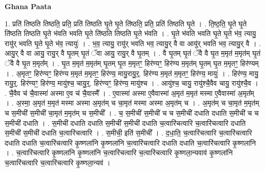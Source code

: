 \documentclass[17pt]{extarticle}
\begin{document}
\textbf{Ghana Paata } \newline

1. प्रति॑ तिष्ठति तिष्ठति॒ प्रति॒ प्रति॑ तिष्ठति घृ॒ते घृ॒ते ति॑ष्ठति॒ प्रति॒ प्रति॑ तिष्ठति घृ॒ते । . ति॒ष्ठ॒ति॒ घृ॒ते घृ॒ते ति॑ष्ठति तिष्ठति घृ॒ते भ॑वति भवति घृ॒ते ति॑ष्ठति तिष्ठति घृ॒ते भ॑वति । . घृ॒ते भ॑वति भवति घृ॒ते घृ॒ते भ॑व॒ त्यायु॒ रायु॑र् भवति घृ॒ते घृ॒ते भ॑व॒ त्यायुः॑ । . भ॒व॒ त्यायु॒ रायु॑र् भवति भव॒ त्यायु॒र् वै वा आयु॑र् भवति भव॒ त्यायु॒र् वै । . आयु॒र् वै वा आयु॒ रायु॒र् वै घृ॒तम् घृ॒तं ॅवा आयु॒ रायु॒र् वै घृ॒तम् । . वै घृ॒तम् घृ॒तं ॅवै वै घृ॒त म॒मृत॑ म॒मृत॑म् घृ॒तं ॅवै वै घृ॒त म॒मृत᳚म् । . घृ॒त म॒मृत॑ म॒मृत॑म् घृ॒तम् घृ॒त म॒मृतꣳ॒॒ हिर॑ण्यꣳ॒॒ हिर॑ण्य म॒मृत॑म् घृ॒तम् घृ॒त म॒मृतꣳ॒॒ हिर॑ण्यम् । . अ॒मृतꣳ॒॒ हिर॑ण्यꣳ॒॒ हिर॑ण्य म॒मृत॑ म॒मृतꣳ॒॒ हिर॑ण्य॒ मायु॒रायु॒र्॒. हिर॑ण्य म॒मृत॑ म॒मृतꣳ॒॒ हिर॑ण्य॒ मायुः॑ । . हिर॑ण्य॒ मायु॒ रायु॒र्॒. हिर॑ण्यꣳ॒॒ हिर॑ण्य॒ मायु॑श्च॒ चायु॒र्॒. हिर॑ण्यꣳ॒॒ हिर॑ण्य॒ मायु॑श्च । . आयु॑श्च॒ चायु॒ रायु॑श्चै॒वैव चायु॒ रायु॑श्चै॒व । . चै॒वैव च॑ चै॒वास्मा॑ अस्मा ए॒व च॑ चै॒वास्मै᳚ । . ए॒वास्मा॑ अस्मा ए॒वैवास्मा॑ अ॒मृत॑ म॒मृत॑ मस्मा ए॒वैवास्मा॑ अ॒मृत᳚म् । . अ॒स्मा॒ अ॒मृत॑ म॒मृत॑ मस्मा अस्मा अ॒मृत॑म् च चा॒मृत॑ मस्मा अस्मा अ॒मृत॑म् च । . अ॒मृत॑म् च चा॒मृत॑ म॒मृत॑म् च स॒मीची॑ स॒मीची॑ चा॒मृत॑ म॒मृत॑म् च स॒मीची᳚ । . च॒ स॒मीची॑ स॒मीची॑ च च स॒मीची॑ दधाति दधाति स॒मीची॑ च च स॒मीची॑ दधाति । . स॒मीची॑ दधाति दधाति स॒मीची॑ स॒मीची॑ दधाति च॒त्वारि॑चत्वारि च॒त्वारि॑चत्वारि दधाति स॒मीची॑ स॒मीची॑ दधाति च॒त्वारि॑चत्वारि । . स॒मीची॒ इति॑ स॒मीची᳚ । . द॒धा॒ति॒ च॒त्वारि॑चत्वारि च॒त्वारि॑चत्वारि दधाति दधाति च॒त्वारि॑चत्वारि कृ॒ष्णला॑नि कृ॒ष्णला॑नि च॒त्वारि॑चत्वारि दधाति दधाति च॒त्वारि॑चत्वारि कृ॒ष्णला॑नि । . च॒त्वारि॑चत्वारि कृ॒ष्णला॑नि कृ॒ष्णला॑नि च॒त्वारि॑चत्वारि च॒त्वारि॑चत्वारि कृ॒ष्णला॒न्यवाव॑ कृ॒ष्णला॑नि च॒त्वारि॑चत्वारि च॒त्वारि॑चत्वारि कृ॒ष्णला॒न्यव॑ । \newline
\end{document}
